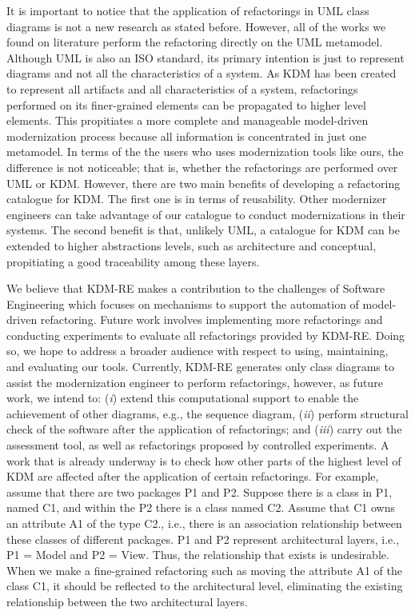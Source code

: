 It is important to notice that the application of refactorings in UML class diagrams is not a new research as stated before. However, all of the works we found on literature perform the refactoring directly on the UML metamodel. Although UML is also an ISO standard, its primary intention is just to represent diagrams and not all the characteristics of a system.  As KDM has been created to represent all artifacts and all characteristics of a system, refactorings performed on its finer-grained elements can be propagated to higher level elements. This propitiates a more complete and manageable model-driven modernization process because all information is concentrated in just one metamodel. 
In terms of the the users who uses modernization tools like ours, the difference is not noticeable; that is, whether the refactorings are performed over UML or KDM. However, there are two main benefits of developing a refactoring catalogue for KDM. The first one is in terms of reusability. Other  modernizer engineers can take advantage of our catalogue to conduct modernizations in their  systems. The second benefit is that, unlikely UML, a catalogue for KDM can be extended to higher abstractions levels, such as architecture and conceptual, propitiating a good traceability among  these layers. 

We believe that KDM-RE makes a contribution to the challenges of Software Engineering which focuses on mechanisms to support the automation of model-driven refactoring. Future work involves implementing more refactorings and conducting experiments to evaluate all refactorings provided by KDM-RE. Doing so, we hope to address a broader
audience with respect to using, maintaining, and evaluating
our tools. Currently, KDM-RE generates only class diagrams to assist the modernization engineer to perform refactorings, however, as future work, we intend to: (\textit{i}) extend this computational support to enable the achievement of other diagrams, e.g.,  the sequence diagram, (\textit{ii}) perform structural check of the software after the application of refactorings; and (\textit{iii}) carry out the assessment tool, as well as refactorings proposed by controlled experiments. %
%
A work that is already underway is to check how other parts of the highest level of KDM are affected after the application of certain refactorings. For example, assume that there are two packages P1 and P2. Suppose there is a class in P1, named C1, and within the P2 there is a class named C2. Assume that C1 owns an attribute A1 of the type C2., i.e., there is an association relationship between these classes of different packages. P1 and P2 represent architectural layers, i.e., P1 = Model and P2 = View. Thus, the relationship that exists is undesirable. When we make a fine-grained refactoring such as moving the attribute A1 of the class C1, it should be reflected to the architectural level, eliminating the existing relationship between the two architectural layers.

